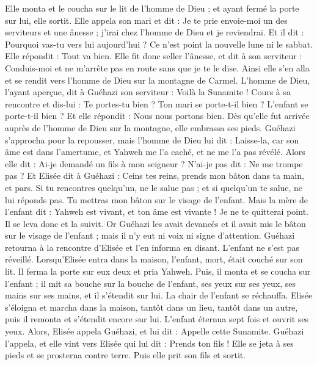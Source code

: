 \begin{multicols}{2}
Elle monta et le coucha sur le lit de l'homme de Dieu ; et ayant fermé la porte sur lui, elle sortit.
Elle appela son mari et dit : Je te prie envoie-moi un des serviteurs et une ânesse ; j'irai chez l'homme de Dieu et je reviendrai.
Et il dit : Pourquoi vas-tu vers lui aujourd'hui ? Ce n'est point la nouvelle lune ni le sabbat. Elle répondit : Tout va bien.
Elle fit donc seller l'ânesse, et dit à son serviteur : Conduis-moi et ne m'arrête pas en route sans que je te le dise.
Ainsi elle s'en alla et se rendit vers l'homme de Dieu sur la montagne de Carmel. L'homme de Dieu, l'ayant aperçue, dit à Guéhazi son serviteur : Voilà la Sunamite !
Cours à sa rencontre et dis-lui : Te portes-tu bien ? Ton mari se porte-t-il bien ? L'enfant se porte-t-il bien ? Et elle répondit : Nous nous portons bien.
Dès qu'elle fut arrivée auprès de l'homme de Dieu sur la montagne, elle embrassa ses pieds. Guéhazi s'approcha pour la repousser, mais l'homme de Dieu lui dit : Laisse-la, car son âme est dans l'amertume, et Yahweh me l'a caché, et ne me l'a pas révélé.
Alors elle dit : Ai-je demandé un fils à mon seigneur ? N'ai-je pas dit : Ne me trompe pas ?
Et Elisée dit à Guéhazi : Ceins tes reins, prends mon bâton dans ta main, et pars. Si tu rencontres quelqu'un, ne le salue pas ; et si quelqu'un te salue, ne lui réponds pas. Tu mettras mon bâton sur le visage de l'enfant.
Mais la mère de l'enfant dit : Yahweh est vivant, et ton âme est vivante ! Je ne te quitterai point. Il se leva donc et la suivit.
Or Guéhazi les avait devancés et il avait mis le bâton sur le visage de l'enfant ; mais il n'y eut ni voix ni signe d'attention. Guéhazi retourna à la rencontre d'Elisée et l'en informa en disant. L'enfant ne s'est pas réveillé.
Lorsqu'Elisée entra dans la maison, l'enfant, mort, était couché sur son lit.
Il ferma la porte sur eux deux et pria Yahweh.
Puis, il monta et se coucha sur l'enfant ; il mit sa bouche sur la bouche de l'enfant, ses yeux sur ses yeux, ses mains sur ses mains, et il s'étendit sur lui. La chair de l'enfant se réchauffa.
Elisée s'éloigna et marcha dans la maison, tantôt dans un lieu, tantôt dans un autre, puis il remonta et s'étendit encore sur lui. L'enfant éternua sept fois et ouvrit ses yeux.
Alors, Elisée appela Guéhazi, et lui dit : Appelle cette Sunamite. Guéhazi l'appela, et elle vint vers Elisée qui lui dit : Prends ton fils !
Elle se jeta à ses pieds et se prosterna contre terre. Puis elle prit son fils et sortit.

\end{multicols}
